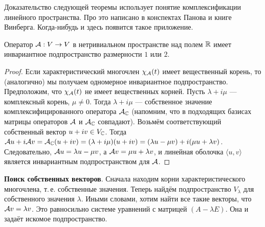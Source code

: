 Доказательство следующей теоремы использует понятие комплексификации линейного пространства. Про это написано в конспектах Панова и книге Винберга. Когда-нибудь и здесь появится такое приложение.

\begin{theorem}
    Оператор $\mathcal{A}: V \to V$ в нетривиальном пространстве над полем $\mathbb{R}$ имеет инвариантное подпространство размерности $1$ или $2$.
\end{theorem}

\begin{proof}
    Если характеристический многочлен $\chi_{\mathcal{A}}(t)$ имеет вещественный корень, то (аналогично) мы получаем одномерное инвариантное подпространство. Предположим, что $\chi_{\mathcal{A}}(t)$ не имеет вещественных корней. Пусть $\lambda + i\mu$ --- комплексный корень, $\mu \ne 0$. Тогда $\lambda + i\mu$ --- собственное значение комплексифицированного оператора $\mathcal{A}_{\mathbb{C}}$ (напомним, что в подходящих базисах матрицы операторов $\mathcal{A}$ и $\mathcal{A}_{\mathbb{C}}$ совпадают). Возьмём соответствующий собственный вектор $u + iv \in V_{\mathbb{C}}$. Тогда $\mathcal{A} u + i\mathcal{A} v = \mathcal{A}_{\mathbb{C}}(u + iv) = (\lambda + i\mu)(u + iv) = (\lambda u - \mu v) + i(\mu u + \lambda v)$. Следовательно, $\mathcal{A} u = \lambda u - \mu v$, а $\mathcal{A} v = \mu u + \lambda v$, и линейная оболочка $\langle u, v\rangle$ является инвариантным подпространством для $\mathcal{A}$.
\end{proof}

\textbf{Поиск собственных векторов}. Сначала находим корни характеристического многочлена, т.\,е. собственные значения. Теперь найдём подпространство $V_\lambda$ для собственного значения $\lambda$. Иными словами, хотим найти все такие векторы, что $\mathcal{A} v = \lambda v$. Это равносильно системе уравнений с матрицей $(A - \lambda E)$. Она и задаёт искомое подпространство.
